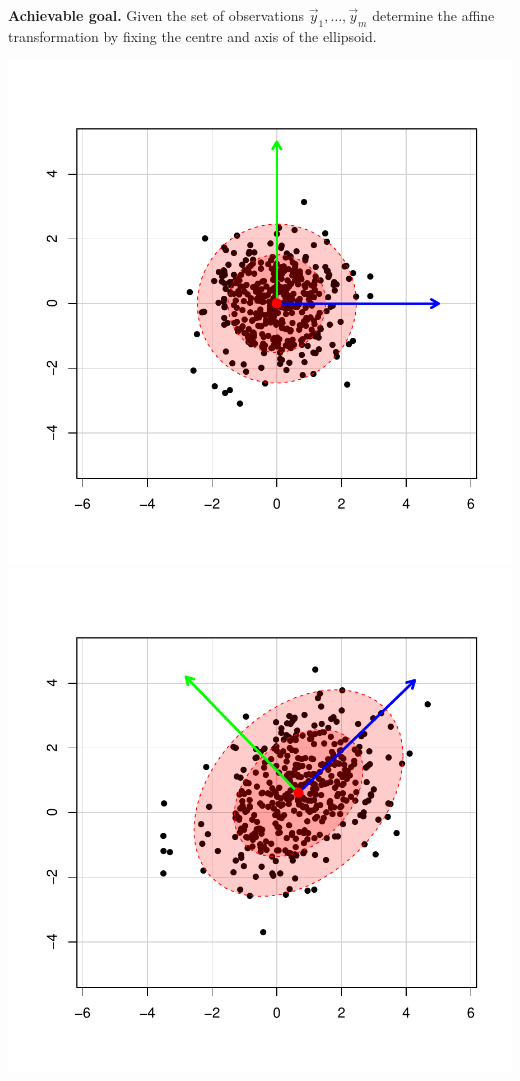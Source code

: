 \documentclass[landscape,footrule]{foils}
\begin{document}
\begin{center}
\end{center}\vspace*{-1cm}




\textbf{Achievable goal.}
Given the set of observations $\vec{y}_1,\ldots, \vec{y}_m$ determine the affine transformation by fixing the centre and axis of the ellipsoid.


\begin{center}
\includegraphics[scale=0.55]{source-distribution-iii.pdf}
\includegraphics[scale=0.55]{target-distribution-iii.pdf}
\end{center}\vspace*{-1cm}
\end{document}
